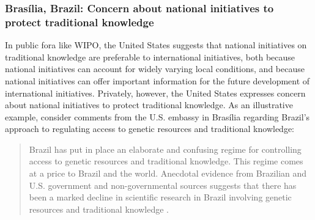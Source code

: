 \documentclass[12pt]{article}
\begin{document}

\subsubsection{Bras\'ilia, Brazil: Concern about national initiatives to protect traditional knowledge}
In public fora like WIPO, the United States suggests that national initiatives on traditional knowledge 
are preferable to international initiatives, both because national initiatives can account for 
widely varying local conditions, and because national initiatives can offer important information for 
the future development of international initiatives. Privately, however, the United States expresses 
concern about national initiatives to protect traditional knowledge. As an illustrative example, 
consider comments from the U.S. embassy in Bras\'ilia regarding Brazil's approach to regulating access 
to genetic resources and traditional knowledge:
\begin{quote}
Brazil has put in place an elaborate and confusing regime for 
controlling access to genetic resources and traditional knowledge. 
This regime comes at a price to Brazil and the world.  Anecdotal 
evidence from Brazilian and U.S. government and non-governmental 
sources suggests that there has been a marked decline in scientific 
research in Brazil involving genetic resources and traditional 
knowledge \citep{u.s._department_of_state2009brazils}.
\end{quote}
\end{document}

